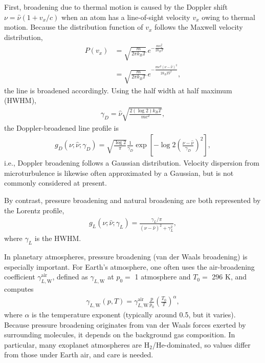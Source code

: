 First, broadening due to thermal motion is caused by the Doppler shift $\nu = \hat{\nu} ( 1 + v_x/c)$ when an atom has a line-of-sight velocity $v_x$ owing to thermal motion. Because the distribution function of $v_x$ follows the Maxwell velocity distribution,
\begin{align}
P(v_x) &= \sqrt{\frac{m}{2 \pi k_B T}} \, e^{-\frac{m v_x^2}{2 k_B T}} \\
&= \sqrt{\frac{m}{2 \pi k_B T}} \, e^{-\frac{m c^2 (\nu - \hat{\nu})^2}{2 k_B T \hat{\nu}^2}},
\label{eq:dopplerveldist}
\end{align}
the line is broadened accordingly. Using the half width at half maximum (HWHM),
\begin{eqnarray}
\gamma_D = \hat{\nu} \sqrt{\frac{2 (\log{2}) k_B T}{m c^2}},
\label{eq:dopplergamma}
\end{eqnarray}
the Doppler-broadened line profile is
\begin{align}
g_D(\nu; \hat{\nu}; \gamma_D) = \sqrt{\frac{\log{2}}{\pi}} \frac{1}{\gamma_D}
\exp\!\left[ - \log{2} \left( \frac{\nu - \hat{\nu}}{\gamma_D}\right)^2 \right],
\label{eq:dopplerprofile}
\end{align}
i.e., Doppler broadening follows a Gaussian distribution. Velocity dispersion from microturbulence is likewise often approximated by a Gaussian, but is not commonly considered at present.

By contrast, pressure broadening and natural broadening are both represented by the Lorentz profile,
\begin{eqnarray}
g_L(\nu; \hat{\nu}; \gamma_L) = \frac{\gamma_L/\pi}{(\nu - \hat{\nu})^2  + \gamma_L^2},
\label{eq:lorentzprofile}
\end{eqnarray}
where $\gamma_L$ is the HWHM.

In planetary atmospheres, pressure broadening (van der Waals broadening) is especially important. For Earth’s atmosphere, one often uses the air-broadening coefficient $\gamma_{L, \mathrm{W}}^{\mathrm{air}}$, defined as $\gamma_{L, \mathrm{W}}$ at $p_0=$ 1 atmosphere and $T_0=$ 296 K, and computes
\begin{eqnarray}
\gamma_{L, \mathrm{W}}(p,T) = \gamma_{L, \mathrm{W}}^{\mathrm{air}} \frac{p}{p_0} \left( \frac{T_0}{T} \right)^\alpha,
\label{eq:airtogen}
\end{eqnarray}
where $\alpha$ is the temperature exponent (typically around 0.5, but it varies). Because pressure broadening originates from van der Waals forces exerted by surrounding molecules, it depends on the background gas composition. In particular, many exoplanet atmospheres are H$_2$/He-dominated, so values differ from those under Earth air, and care is needed.

